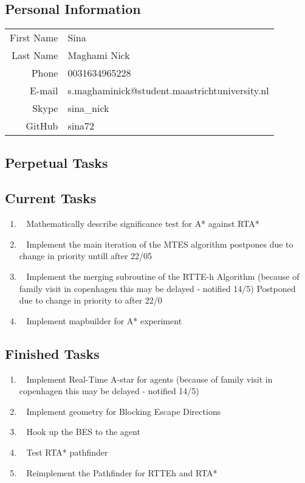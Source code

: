 \subsection{Personal Information}
\begin{table}[h!]
	\begin{tabular}{rl}
		First Name 	& Sina\\
		Last Name	& Maghami Nick\\
		Phone		& 0031634965228\\
		E-mail		& s.maghaminick@student.maastrichtuniversity.nl\\
		Skype		& sina\_nick\\
		GitHub		& sina72
	\end{tabular}
\end{table}

\subsection{Perpetual Tasks}

\subsection{Current Tasks}
\begin{enumerate}
	\item~
	Mathematically describe significance test for A* against RTA*
	\item~
	Implement the main iteration of the MTES algorithm
		\subitem postpones due to change in priority untill after 22/05
	\item~
	Implement the merging subroutine of the RTTE-h Algorithm
		\subitem (because of family visit in copenhagen this may be delayed - notified 14/5)
		\subitem Postponed due to change in priority to after 22/0
	\item~
		Implement mapbuilder for A* experiment
\end{enumerate}
\subsection{Finished Tasks}
\begin{enumerate}
	\item~
	Implement Real-Time A-star for agents
		\subitem (because of family visit in copenhagen this may be delayed - notified 14/5)
	\item~
		Implement geometry for Blocking Escape Directions
	\item~
		Hook up the BES to the agent
	\item~
		Test RTA* pathfinder
	\item~
		Reimplement the Pathfinder for RTTEh and RTA*
\end{enumerate}

